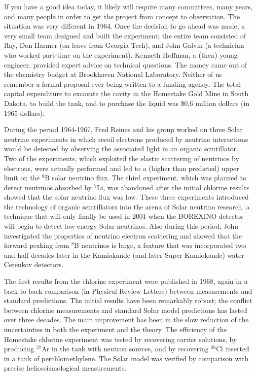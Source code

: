 \documentclass[a4paper,10pt]{article}
\begin{document}
{\noindent}If you have a good idea today, it likely will require many committees, many years, and many people in order to get the project from concept to observation. The situation was very different in 1964. Once the decision to go ahead was made, a very small team designed and built the experiment; the entire team consisted of Ray, Don Harmer (on leave from Georgia Tech), and John Galvin (a technician who worked part-time on the experiment). Kenneth Hoffman, a (then) young engineer, provided expert advice on technical questions. The money came out of the chemistry budget at Brookhaven National Laboratory. Neither of us remember a formal proposal ever being written to a funding agency. The total capital expenditure to excavate the cavity in the Homestake Gold Mine in South Dakota, to build the tank, and to purchase the liquid was \$0.6 million dollars (in 1965 dollars).

{\noindent}During the period 1964-1967, Fred Reines and his group worked on three Solar neutrino experiments in which recoil electrons produced by neutrino interactions would be detected by observing the associated light in an organic scintillator. Two of the experiments, which exploited the elastic scattering of neutrinos by electrons, were actually performed and led to a (higher than predicted) upper limit on the $^8$B solar neutrino flux. The third experiment, which was planned to detect neutrinos absorbed by $^7$Li, was abandoned after the initial chlorine results showed that the solar neutrino flux was low. These three experiments introduced the technology of organic scintillators into the arena of Solar neutrino research, a technique that will only finally be used in 2001 when the BOREXINO detector will begin to detect low-energy Solar neutrinos. Also during this period, John investigated the properties of neutrino electron scattering and showed that the forward peaking from $^8$B neutrinos is large, a feature that was incorporated two and half decades later in the Kamiokande (and later Super-Kamiokande) water Cerenkov detectors.

{\noindent}The first results from the chlorine experiment were published in 1968, again in a back-to-back comparison (in Physical Review Letters) between measurements and standard predictions. The initial results have been remarkably robust; the conflict between chlorine measurements and standard Solar model predictions has lasted over three decades. The main improvement has been in the slow reduction of the uncertainties in both the experiment and the theory. The efficiency of the Homestake chlorine experiment was tested by recovering carrier solutions, by producing $^{37}$Ar in the tank with neutron sources, and by recovering $^{36}$Cl inserted in a tank of perchloroethylene. The Solar model was verified by comparison with precise helioseismological measurements.
\end{document}
